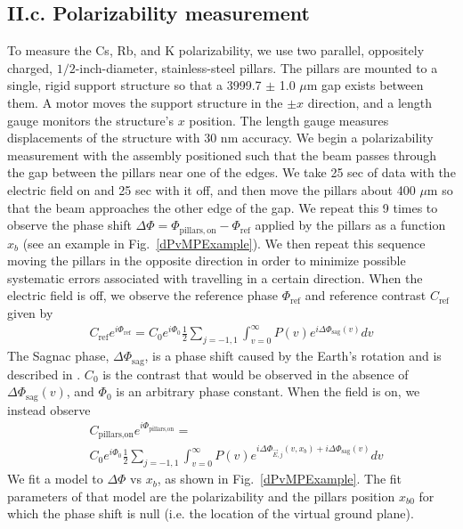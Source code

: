 \documentclass[twocolumn,prl,showpacs,superscriptaddress]{revtex4-1}   %
\newcommand{\figref}[1]{Fig.~\ref{#1}}
\newcommand{\dphisag}{\Delta\Phi_{\mathrm{sag}}}
\begin{document}
\subsection{II.c. Polarizability measurement}

To measure the Cs, Rb, and K polarizability, we use two parallel, oppositely charged, $1/2$-inch-diameter, stainless-steel pillars. The pillars are mounted to a single, rigid support structure so that a 3999.7 $\pm$ 1.0 $\mu$m gap exists between them. A motor moves the support structure in the $\pm x$ direction, and a length gauge monitors the structure's $x$ position. The length gauge measures displacements of the structure with 30 nm accuracy. 
We begin a polarizability measurement with the assembly positioned such that the beam passes through the gap between the pillars near one of the edges.
We take 25 sec of data with the electric field on and 25 sec with it off, and then move the pillars about 400 $\mu$m so that the beam approaches the other edge of the gap. We repeat this 9 times to 
observe the phase shift $\Delta\Phi = \Phi_{\mathrm{pillars,on}} - \Phi_{\mathrm{ref}}$ applied by the pillars as a function $x_b$ (see an example in \figref{dPvMPExample}). 
We then repeat this sequence moving the pillars in the opposite direction in order to minimize possible systematic errors associated with travelling in a certain direction.
When the electric field is off, we observe the reference phase $\Phi_{\mathrm{ref}}$ and reference contrast $C_{\mathrm{ref}}$ given by 
\begin{align}
	C_{\mathrm{ref}}e^{i\Phi_{\mathrm{ref}}} = 
		C_0e^{i\Phi_0} \frac{1}{2} \sum_{j=-1,1}
		\int_{v=0}^{\infty} P(v)
		e^{i\dphisag(v)} 
		dv
	\label{CPPolesRef}
\end{align}
The Sagnac phase, $\dphisag$, is a phase shift caused by the Earth's rotation and is described in \cite{Holmgren2010,Lenef1997,Jacquey2008}.
$C_0$ is the contrast that would be observed in the absence of $\dphisag(v)$, and $\Phi_0$ is an arbitrary phase constant.
When the field is on, we instead observe
\begin{align}
	& C_{\textrm{pillars,on}}e^{i\Phi_{\textrm{pillars,on}}} = \nonumber \\
		& C_0e^{i\Phi_0}		
		\frac{1}{2} \sum_{j=-1,1}
		\int_{v=0}^{\infty} P(v)
		e^{
			i\Delta\Phi_{\vec{E},j}(v,x_b) + 
			i\dphisag(v)
		} 
		dv
	\label{CPPolesEOn}
\end{align}
We fit a model to $\Delta\Phi$ vs $x_b$, as shown in \figref{dPvMPExample}. The fit parameters of that model are the polarizability and the pillars position $x_{b0}$ for which the phase shift is null (i.e. the location of the virtual ground plane). 
\end{document}
